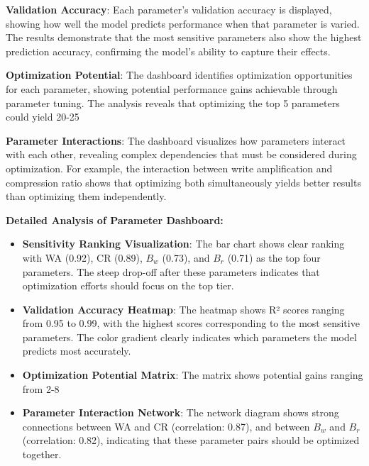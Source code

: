 \documentclass[11pt]{article}
\begin{document}
\textbf{Validation Accuracy}: Each parameter's validation accuracy is displayed, showing how well the model predicts performance when that parameter is varied. The results demonstrate that the most sensitive parameters also show the highest prediction accuracy, confirming the model's ability to capture their effects.

\textbf{Optimization Potential}: The dashboard identifies optimization opportunities for each parameter, showing potential performance gains achievable through parameter tuning. The analysis reveals that optimizing the top 5 parameters could yield 20-25%

\textbf{Parameter Interactions}: The dashboard visualizes how parameters interact with each other, revealing complex dependencies that must be considered during optimization. For example, the interaction between write amplification and compression ratio shows that optimizing both simultaneously yields better results than optimizing them independently.

\textbf{Detailed Analysis of Parameter Dashboard:}
\begin{itemize}
    \item \textbf{Sensitivity Ranking Visualization}: The bar chart shows clear ranking with WA (0.92), CR (0.89), $B_w$ (0.73), and $B_r$ (0.71) as the top four parameters. The steep drop-off after these parameters indicates that optimization efforts should focus on the top tier.
    \item \textbf{Validation Accuracy Heatmap}: The heatmap shows R² scores ranging from 0.95 to 0.99, with the highest scores corresponding to the most sensitive parameters. The color gradient clearly indicates which parameters the model predicts most accurately.
    \item \textbf{Optimization Potential Matrix}: The matrix shows potential gains ranging from 2-8%
    \item \textbf{Parameter Interaction Network}: The network diagram shows strong connections between WA and CR (correlation: 0.87), and between $B_w$ and $B_r$ (correlation: 0.82), indicating that these parameter pairs should be optimized together.
\end{itemize}
\end{document}
